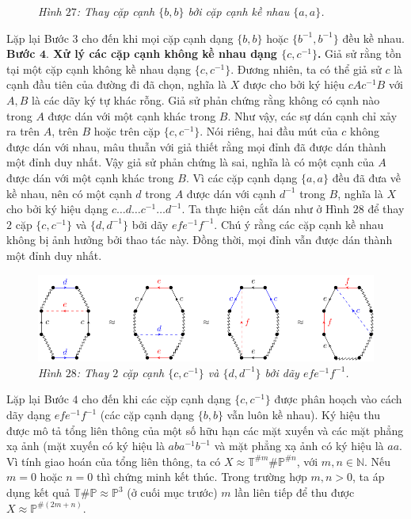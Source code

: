 \begin{multicols}{2}
\begin{figure}[H]
		\caption{\small\textit{\color{duongvaotoanhoc}Hình $27$: Thay cặp cạnh $\{b,b\}$ bởi cặp cạnh kề nhau $\{a,a\}$.}}
		\vspace*{-10pt}
	\end{figure}
	Lặp lại Bước $3$ cho đến khi mọi cặp cạnh dạng $\{b,b\}$ hoặc $\{b^{-1},b^{-1}\}$ đều kề nhau.
	\vskip 0.1cm
	{\bf\color{duongvaotoanhoc} Bước $\pmb{4.}$ Xử lý các cặp cạnh không kề nhau dạng $\{c,c^{-1}\}$.} Giả sử rằng tồn tại một cặp cạnh không kề nhau dạng $\{c,c^{-1}\}$. Đương nhiên, ta có thể giả sử $c$ là cạnh đầu tiên của đường đi đã chọn, nghĩa là $X$ được cho bởi ký hiệu $cAc^{-1}B$ với $A,B$ là các dãy ký tự khác rỗng. Giả sử phản chứng rằng không có cạnh nào trong $A$ được dán với một cạnh khác trong $B$. Như vậy, các sự dán cạnh chỉ xảy ra trên $A$, trên $B$ hoặc trên cặp $\{c,c^{-1}\}$. Nói riêng, hai đầu mút của $c$ không được dán với nhau, mâu thuẫn với giả thiết rằng mọi đỉnh đã được dán thành một đỉnh duy nhất. Vậy giả sử phản chứng là sai, nghĩa là có một cạnh của $A$ được dán với một cạnh khác trong $B$. Vì các cặp cạnh dạng $\{a,a\}$ đều đã đưa về kề nhau, nên có một cạnh $d$ trong $A$ được dán với cạnh $d^{-1}$ trong $B$, nghĩa là $X$ cho bởi ký hiệu dạng $c\ldots d \ldots c^{-1} \ldots d^{-1}$. Ta thực hiện cắt dán như ở Hình $28$ để thay $2$ cặp $\{c,c^{-1}\}$ và $\{d,d^{-1}\}$ bởi dãy $efe^{-1}f^{-1}$. Chú ý rằng các cặp cạnh kề nhau không bị ảnh hưởng bởi thao tác này. Đồng thời, mọi đỉnh vẫn được dán thành một đỉnh duy nhất.
	\begin{figure}[H]
		\vspace*{-5pt}
		\centering\captionsetup{labelformat=empty, justification=centering}
		\includegraphics[width=1\linewidth]{H28.pdf}
		\caption{\small\textit{\color{duongvaotoanhoc}Hình $28$: Thay $2$ cặp cạnh $\{c,c^{-1}\}$ và $\{d,d^{-1}\}$ bởi dãy $efe^{-1}f^{-1}$.}}
		\vspace*{-10pt}
	\end{figure}
	Lặp lại Bước $4$ cho đến khi các cặp cạnh dạng $\{c,c^{-1}\}$ được phân hoạch vào cách dãy dạng $efe^{-1}f^{-1}$ (các cặp cạnh dạng $\{b,b\}$ vẫn luôn kề nhau). Ký hiệu thu được mô tả tổng liên thông của một số hữu hạn các mặt xuyến và các mặt phẳng xạ ảnh (mặt xuyến có ký hiệu là $aba^{-1}b^{-1}$ và mặt phẳng xạ ảnh có ký hiệu là $aa$. Vì tính giao hoán của tổng liên thông, ta có $X \approx \mathbb{T}^{\# m} \# \mathbb{P}^{\# n}$, với $m,n \in \mathbb{N}$. Nếu $m=0$ hoặc $n = 0$ thì chứng minh kết thúc. Trong trường hợp $m,n > 0$, ta áp dụng kết quả $\mathbb{T} \# \mathbb{P} \approx \mathbb{P}^3$ (ở cuối mục trước) $m$ lần liên tiếp để thu được $X \approx \mathbb{P}^{\# (2m + n)}$.

\end{multicols}
